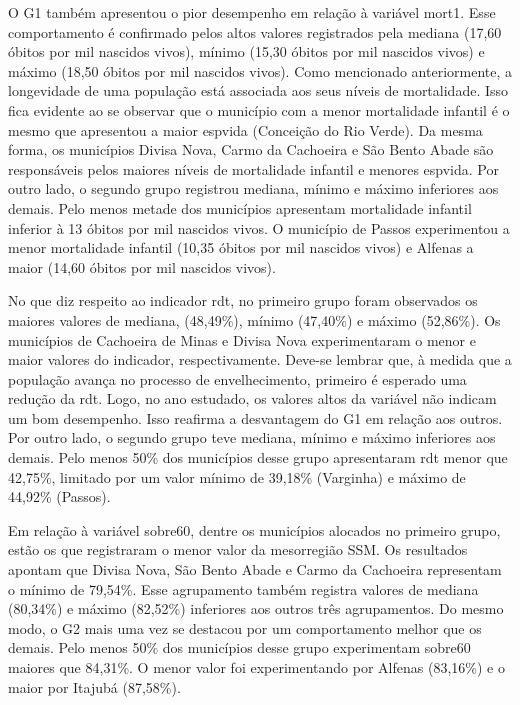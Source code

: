 \documentclass[10pt,twoside]{article}
\begin{document}
O G1 também apresentou o pior desempenho em relação à variável mort1. Esse comportamento é confirmado pelos altos valores registrados pela mediana (17,60 óbitos por mil nascidos vivos), mínimo (15,30 óbitos por mil nascidos vivos) e máximo (18,50 óbitos por mil nascidos vivos). Como mencionado anteriormente, a longevidade de uma população está associada aos seus níveis de mortalidade. Isso fica evidente ao se observar que o município com a menor mortalidade infantil é o mesmo que apresentou a maior espvida (Conceição do Rio Verde). Da mesma forma, os municípios Divisa Nova, Carmo da Cachoeira e São Bento Abade são responsáveis pelos maiores níveis de mortalidade infantil e menores espvida. Por outro lado, o segundo grupo registrou mediana, mínimo e máximo inferiores aos demais. Pelo menos metade dos municípios apresentam mortalidade infantil inferior à 13 óbitos por mil nascidos vivos. O município de Passos experimentou a menor mortalidade infantil (10,35 óbitos por mil nascidos vivos) e Alfenas a maior (14,60 óbitos por mil nascidos vivos).

No que diz respeito ao indicador rdt, no primeiro grupo foram observados os maiores valores de mediana, (48,49\%), mínimo (47,40\%) e máximo (52,86\%). Os municípios de Cachoeira de Minas e Divisa Nova experimentaram o menor e maior valores do indicador, respectivamente. Deve-se lembrar que, à medida que a população avança no processo de envelhecimento, primeiro é esperado uma redução da rdt. Logo, no ano estudado, os valores altos da variável não indicam um bom desempenho. Isso reafirma a desvantagem do G1 em relação aos outros. Por outro lado, o segundo grupo teve mediana, mínimo e máximo inferiores aos demais. Pelo menos 50\% dos municípios desse grupo apresentaram rdt menor que 42,75\%, limitado por um valor mínimo de 39,18\% (Varginha) e máximo de 44,92\% (Passos).

Em relação à variável sobre60, dentre os municípios alocados no primeiro grupo, estão os que registraram o menor valor da mesorregião SSM. Os resultados apontam que Divisa Nova, São Bento Abade e Carmo da Cachoeira representam o mínimo de 79,54\%. Esse agrupamento também registra valores de mediana (80,34\%) e máximo (82,52\%) inferiores aos outros três agrupamentos. Do mesmo modo, o G2 mais uma vez se destacou por um comportamento melhor que os demais. Pelo menos 50\% dos municípios desse grupo experimentam sobre60 maiores que 84,31\%. O menor valor foi experimentando por Alfenas  (83,16\%) e o maior por Itajubá (87,58\%).
\end{document}
